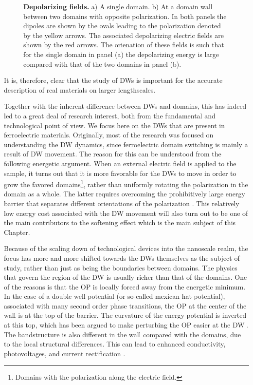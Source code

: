 \begin{figure}[h]
	\caption{\label{fig:BTO_depolarizing_schematic}{\bf Depolarizing fields.} a) A single domain. b) At a domain wall between two domains with opposite polarization. In both panels the dipoles are shown by the ovals leading to the polarization denoted by the yellow arrows. The associated depolarizing electric fields are shown by the red arrows. The orienation of these fields is such that for the single domain in panel (a) the depolarizing energy is large compared with that of the two domains in panel (b).}    
\end{figure}
It is, therefore, clear that the study of DWs is important for the accurate description of real materials on larger lengthscales. 

Together with the inherent difference between DWs and domains, this has indeed led to a great deal of research interest, both from the fundamental and technological point of view.
We focus here on the DWs that are present in ferroelectric materials.
Originally, most of the research was focused on understanding the DW dynamics, since ferroelectric domain switching is mainly a result of DW movement.
The reason for this can be understood from the following energetic argument.
When an external electric field is applied to the sample, it turns out that it is more favorable for the DWs to move in order to grow the favored domains\footnote{Domains with the polarization along the electric field.}, rather than uniformly rotating the polarization in the domain as a whole.
The latter requires overcoming the prohibitively large energy barrier that separates different orientations of the polarization \cite{Tagantsev2010}.
This relatively low energy cost associated with the DW movement will also turn out to be one of the main contributors to the softening effect which is the main subject of this Chapter.

Because of the scaling down of technological devices into the nanoscale realm, the focus has more and more shifted towards the DWs themselves as the subject of study, rather than just as being the boundaries between domains.
The physics that govern the region of the DW is usually richer than that of the domains. One of the reasons is that the OP is locally forced away from the energetic minimum.
In the case of a double well potential (or so-called mexican hat potential), associated with many second order phase transitions, the OP at the center of the wall is at the top of the barrier.
The curvature of the energy potential is inverted at this top, which has been argued to make perturbing the OP easier at the DW \cite{Scott2012}.
The bandstructure is also different in the wall compared with the domains, due to the local structural differences.
This can lead to enhanced conductivity, photovoltages, and current rectification \cite{Huyan2019}.

